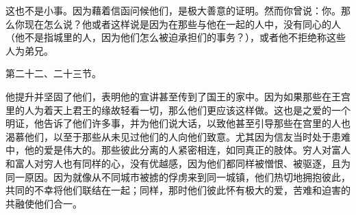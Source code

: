  这也不是小事。因为藉着信函问候他们，是极大善意的证明。然而你曾说：你。那么你现在怎么说？他或者这样说是因为在那些与他在一起的人中，没有同心的人（他不是指城里的人，因为他们怎么被迫承担们的事务？），或者他不拒绝称这些人为弟兄。\par

第二十二、二十三节。\par

他提升并坚固了他们，表明他的宣讲甚至传到了国王的家中。因为如果那些在王宫里的人为着天上君王的缘故轻看一切，那么他们更应该这样做。这也是之爱的一个明证，他告诉了他们许多事，并为他们说大话，以致他甚至引导那些在宫里的人也渴慕他们，以至于那些从未见过他们的人向他们致意。尤其因为信友当时处于患难中，他的爱是伟大的。那些彼此分离的人紧密相连，如同真正的肢体。穷人对富人和富人对穷人也有同样的心，没有优越感，因为他们都同样被憎恨、被驱逐，且为同一原因。因为就像从不同城市被掳的俘虏来到同一城镇，他们热切地拥抱彼此，共同的不幸将他们联结在一起；同样，那时他们彼此怀有极大的爱，苦难和迫害的共融使他们合一。\par

